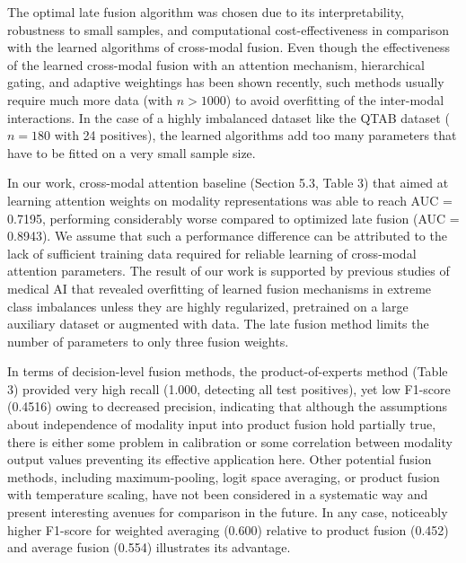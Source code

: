\documentclass[10pt,letterpaper]{article}
\begin{document}
                                                                                                                                                                         The optimal late fusion algorithm was chosen due to its interpretability, robustness to small samples, and computational cost-effectiveness in comparison with the learned algorithms of cross-modal fusion. Even though the effectiveness of the learned cross-modal fusion with an attention mechanism, hierarchical gating, and adaptive weightings has been shown recently, such methods usually require much more data (with $n > 1000$) to avoid overfitting of the inter-modal interactions. In the case of a highly imbalanced dataset like the QTAB dataset ($n = 180$ with 24 positives), the learned algorithms add too many parameters that have to be fitted on a very small sample size.

                                                                                                                                                                          In our work, cross-modal attention baseline (Section 5.3, Table 3) that aimed at learning attention weights on modality representations was able to reach AUC = 0.7195, performing considerably worse compared to optimized late fusion (AUC = 0.8943). We assume that such a performance difference can be attributed to the lack of sufficient training data required for reliable learning of cross-modal attention parameters. The result of our work is supported by previous studies of medical AI that revealed overfitting of learned fusion mechanisms in extreme class imbalances unless they are highly regularized, pretrained on a large auxiliary dataset or augmented with data. The late fusion method limits the number of parameters to only three fusion weights.

                                                                                                                                                                          In terms of decision-level fusion methods, the product-of-experts method (Table 3) provided very high recall (1.000, detecting all test positives), yet low F1-score (0.4516) owing to decreased precision, indicating that although the assumptions about independence of modality input into product fusion hold partially true, there is either some problem in calibration or some correlation between modality output values preventing its effective application here. Other potential fusion methods, including maximum-pooling, logit space averaging, or product fusion with temperature scaling, have not been considered in a systematic way and present interesting avenues for comparison in the future. In any case, noticeably higher F1-score for weighted averaging (0.600) relative to product fusion (0.452) and average fusion (0.554) illustrates its advantage.
\end{document}

